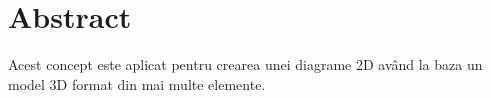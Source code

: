 \newpage
\section{Abstract}

Acest concept este aplicat pentru crearea unei diagrame 2D având la baza un model 3D format din mai multe elemente.
